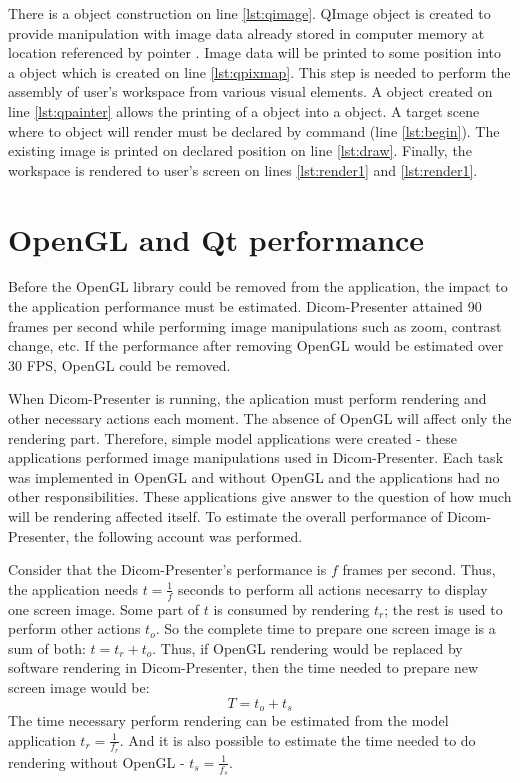There is a  object construction on line \ref{lst:qimage}. QImage object is created to provide manipulation with image data already stored in computer memory at location referenced by pointer . Image data will be printed to some position into a  object which is created on line \ref{lst:qpixmap}. This step is needed to perform the assembly of user's workspace from various visual elements. A  object created on line \ref{lst:qpainter} allows the printing of a  object into a  object. A target scene where to  object will render must be declared by  command (line \ref{lst:begin}). The existing image is printed on declared position on line \ref{lst:draw}. Finally, the workspace is rendered to user's screen on lines \ref{lst:render1} and \ref{lst:render1}.


\section{OpenGL and Qt performance}
Before the OpenGL library could be removed from the application, the impact to the application performance must be estimated. Dicom-Presenter attained 90 frames per second while performing image manipulations such as zoom, contrast change, etc. If the performance after removing OpenGL would be estimated over 30 FPS, OpenGL could be removed. 

When Dicom-Presenter is running, the aplication must perform rendering and other necessary actions each moment. The absence of OpenGL will affect only the rendering part. Therefore, simple model applications were created - these applications performed image manipulations used in Dicom-Presenter. Each task was implemented in OpenGL and without OpenGL and the applications had no other responsibilities. These applications give answer to the question of how much will be rendering affected itself. To estimate the overall performance of Dicom-Presenter, the following account was performed.
 
Consider that the Dicom-Presenter's performance is $f$ frames per second. Thus, the application needs $t=\frac{1}{f}$ seconds to perform all actions necesarry to display one screen image.  Some part of $t$ is consumed by rendering $t_{r}$; the rest is used to perform other actions $t_{o}$. So the complete time to prepare one screen image is a sum of both: $t=t_{r}+t_{o}$. Thus, if OpenGL rendering would be replaced by software rendering in Dicom-Presenter, then the time needed to prepare new screen image would be:
\begin{equation} \label{T}
T=t_{o} + t_{s}
\end{equation} 
The time necessary perform rendering can be estimated from the model application $t_{r} = \frac{1}{f_{r}}$. And it is also possible to estimate the time needed to do rendering without OpenGL - $t_{s} = \frac{1}{f_{s}}$.

